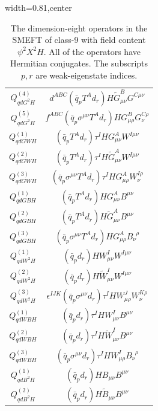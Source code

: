 \begin{table}[H]
\begin{center}
\begin{adjustbox}{width=0.81\textwidth,center}
\begin{minipage}[t]{5.6cm}
\begin{tabular}[t]{c|c}
% 
$Q_{qdG^2H}^{(4)}$  &  $d^{ABC} (\bar q_p T^A d_r) H \widetilde G^B_{\mu\nu} G^{C\mu\nu} $ \\
% 
$Q_{qdG^2H}^{(5)}$  &  $f^{ABC} (\bar q_p \sigma^{\mu\nu} T^A d_r) H G_{\mu\rho}^B G_\nu^{C\rho}$ \\
%
$Q_{qdGWH}^{(1)}$  &  $(\bar q_p T^A d_r) \tau^I H G^A_{\mu\nu} W^{I\mu\nu} $ \\
% 
$Q_{qdGWH}^{(2)}$  &  $(\bar q_p T^A d_r) \tau^I H \widetilde G^A_{\mu\nu} W^{I\mu\nu} $ \\
% 
$Q_{qdGWH}^{(3)}$  &  $(\bar q_p \sigma^{\mu\nu} T^A d_r) \tau^I H G_{\mu\rho}^A W_\nu^{I\rho}$ \\
%
$Q_{qdGBH}^{(1)}$  &  $(\bar q_p T^A d_r) H G^A_{\mu\nu} B^{\mu\nu} $ \\
% 
$Q_{qdGBH}^{(2)}$  &  $(\bar q_p T^A d_r) H \widetilde G^A_{\mu\nu} B^{\mu\nu} $ \\
% 
$Q_{qdGBH}^{(3)}$  &  $(\bar q_p \sigma^{\mu\nu} T^A d_r) H G_{\mu\rho}^A B_\nu^{\,\,\,\rho}$ \\
%
$Q_{qdW^2H}^{(1)}$  &  $(\bar q_p d_r) H W^I_{\mu\nu} W^{I\mu\nu} $ \\
% 
$Q_{qdW^2H}^{(2)}$  &  $(\bar q_p d_r) H \widetilde W^I_{\mu\nu} W^{I\mu\nu} $ \\
% 
$Q_{qdW^2H}^{(3)}$  &  $\epsilon^{IJK} (\bar q_p \sigma^{\mu\nu} d_r) \tau^I H W_{\mu\rho}^J W_\nu^{K\rho}$ \\
%
$Q_{qdWBH}^{(1)}$  &  $(\bar q_p d_r) \tau^I H W^I_{\mu\nu} B^{\mu\nu} $ \\
% 
$Q_{qdWBH}^{(2)}$  &  $(\bar q_p d_r) \tau^I H \widetilde W^I_{\mu\nu} B^{\mu\nu} $ \\
% 
$Q_{qdWBH}^{(3)}$  &  $(\bar q_p \sigma^{\mu\nu} d_r) \tau^I H W_{\mu\rho}^I B_\nu^{\,\,\,\rho}$ \\
%
$Q_{qdB^2H}^{(1)}$  &  $(\bar q_p d_r) H B_{\mu\nu} B^{\mu\nu} $ \\
% 
$Q_{qdB^2H}^{(2)}$  &  $(\bar q_p d_r) H \widetilde B_{\mu\nu} B^{\mu\nu} $
\end{tabular}
\end{minipage}
\end{adjustbox}
\end{center}
\caption{The dimension-eight operators in the SMEFT of class-9 with field content $\psi^2X^2H$. All of the operators have Hermitian conjugates. The subscripts $p, r$ are weak-eigenstate indices.}
\label{tab:smeft8class_9}
\end{table}